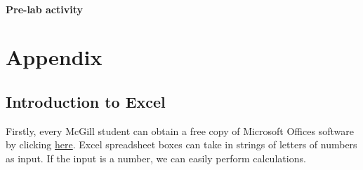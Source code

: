 \documentclass[12pt]{report}
\begin{document}
\subsection{Pre-lab activity}

{}
\part*{Appendix} \label{Part:Appendix}

{}
\chapter*{Introduction to Excel}

Firstly, every McGill student can obtain a free copy of Microsoft Offices software by clicking \href{http://kb.mcgill.ca/kb/article?ArticleId=5172&source=Article&c=12&cid=2}{here}. Excel spreadsheet boxes can take in strings of letters of numbers as input. If the input is a number, we can easily perform calculations.\\
\end{document}
